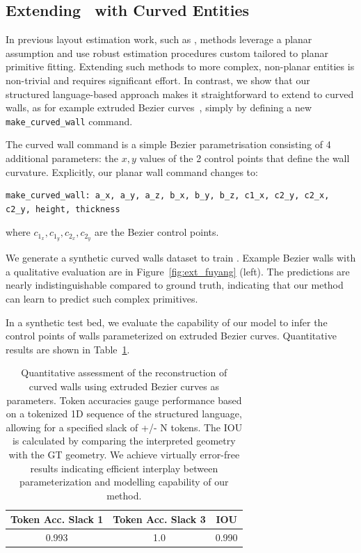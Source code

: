 \subsection{Extending \METHOD~with Curved Entities}


In previous layout estimation work, such as \cite{furukawa2009reconstructing,liu2019planercnn},
methods leverage a planar assumption
and use robust estimation procedures custom tailored to planar primitive fitting.
Extending such methods to more complex, non-planar entities is non-trivial and requires significant effort.
In contrast,
we show that our structured language-based approach makes it straightforward to extend to curved walls,
as for example extruded Bezier curves~\cite{beziercurves},
simply by defining a new \texttt{make\_curved\_wall} command. 

The curved wall command is a simple Bezier parametrisation
consisting of 4 additional parameters:
the $x,y$ values of the 2 control points
that define the wall curvature.
Explicitly, our planar wall command changes to: 
\begin{lstlisting}[language=StructuredLanguage]
make_curved_wall: a_x, a_y, a_z, b_x, b_y, b_z, c1_x, c2_y, c2_x, c2_y, height, thickness
\end{lstlisting}
where $c_{1_x}, c_{1_y}, c_{2_x}, c_{2_y}$ are the Bezier control points. 


We generate a synthetic curved walls dataset to train \METHOD.
Example Bezier walls with a qualitative evaluation are in Figure~\ref{fig:ext_fuyang} (left).
The predictions are nearly indistinguishable compared to ground truth,
indicating that our method can learn to predict such complex primitives.

In a synthetic test bed, we evaluate the capability of our model to infer the control points of walls parameterized on extruded Bezier curves. Quantitative results are shown in Table~\ref{tab:quantitative_eval_bezier_cuves}.

\begin{table}[]
\centering
\caption{Quantitative assessment of the reconstruction of curved walls using extruded Bezier curves as parameters. Token accuracies gauge performance based on a tokenized 1D sequence of the structured language, allowing for a specified slack of +/- N tokens. The IOU is calculated by comparing the interpreted geometry with the GT geometry. We achieve virtually error-free results indicating efficient interplay between parameterization and modelling capability of our method.}
\begin{tabular}{c|c|c}
     Token Acc. Slack 1 & Token Acc. Slack 3 & IOU \\ 
    \hline
       0.993 & 1.0 & 0.990 \\
\end{tabular}
\label{tab:quantitative_eval_bezier_cuves}
\end{table}




